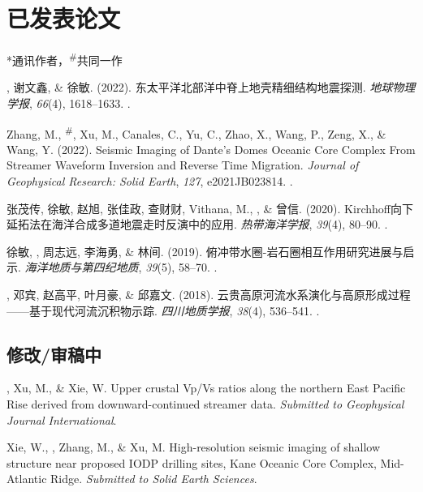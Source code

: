 \section{已发表论文}
\newcommand{\CS}{*} %
\newcommand{\CF}{\textsuperscript{\#}} %

\CS 通讯作者，\CF 共同一作
\begin{etaremune}
\item
    \狄, 谢文鑫, \& 徐敏. (2022).
    东太平洋北部洋中脊上地壳精细结构地震探测.
    \textit{地球物理学报}, \textit{66}(4), 1618--1633.
    .
\item
    Zhang, M., \Di\CF, Xu, M., Canales, C., Yu, C., Zhao, X., Wang, P., Zeng, X., \& Wang, Y. (2022).
    Seismic Imaging of Dante's Domes Oceanic Core Complex From Streamer Waveform Inversion and Reverse Time Migration.
    \textit{Journal of Geophysical Research: Solid Earth}, \textit{127}, e2021JB023814.
    .
\item
    张茂传, 徐敏, 赵旭, 张佳政, 查财财, Vithana, M., \狄, \& 曾信. (2020).
    Kirchhoff向下延拓法在海洋合成多道地震走时反演中的应用.
    \textit{热带海洋学报}, \textit{39}(4), 80--90.
    .
\item
    徐敏, \狄, 周志远, 李海勇, \& 林间. (2019).
    俯冲带水圈-岩石圈相互作用研究进展与启示.
    \textit{海洋地质与第四纪地质}, \textit{39}(5), 58--70.
    .
\item
    \狄, 邓宾, 赵高平, 叶月豪, \& 邱嘉文. (2018).
    云贵高原河流水系演化与高原形成过程——基于现代河流沉积物示踪.
    \textit{四川地质学报}, \textit{38}(4), 536--541.
    .
\end{etaremune}

\subsection*{修改/审稿中}
\begin{etaremune}
\item
    \Di, Xu, M., \& Xie, W.
    Upper crustal Vp/Vs ratios along the northern East Pacific Rise derived from downward-continued streamer data.
    \textit{Submitted to Geophysical Journal International}.
\item
    Xie, W., \Di, Zhang, M., \&  Xu, M.
    High-resolution seismic imaging of shallow structure near proposed IODP drilling sites, Kane Oceanic Core Complex, Mid-Atlantic Ridge.
    \textit{Submitted to Solid Earth Sciences}.
\end{etaremune}

